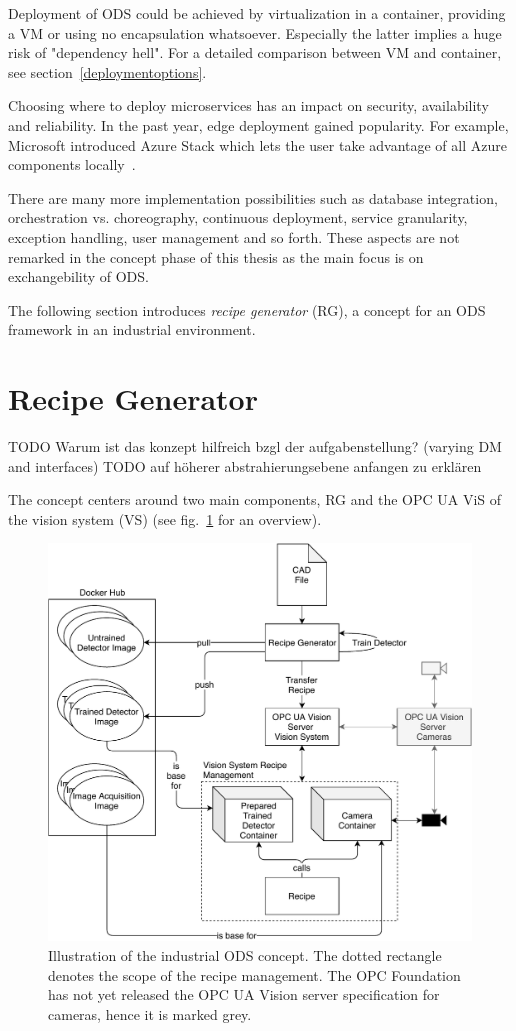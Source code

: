 Deployment of ODS could be achieved by virtualization in a container, providing a VM or using no encapsulation whatsoever. Especially the latter implies a huge risk of "dependency hell". For a detailed comparison between VM and container, see section~\ref{deploymentoptions}.

Choosing where to deploy microservices has an impact on security, availability and reliability. In the past year, edge deployment gained popularity. For example, Microsoft introduced Azure Stack which lets the user take advantage of all Azure components locally~\cite{Azure-Documentation2019Was2019}.

There are many more implementation possibilities such as database integration, orchestration vs. choreography, continuous deployment, service granularity, exception handling, user management and so forth. These aspects are not remarked in the concept phase of this thesis as the main focus is on exchangebility of ODS.

The following section introduces \textit{recipe generator} (RG), a concept for an ODS framework in an industrial environment.

\section{Recipe Generator}
TODO Warum ist das konzept hilfreich bzgl der aufgabenstellung? (varying DM and interfaces)
TODO auf höherer abstrahierungsebene anfangen zu erklären

The concept centers around two main components, RG and the OPC UA ViS of the vision system (VS) (see fig.~\ref{fig:concept} for an overview).
\begin{figure}
    \centering
    \includegraphics[width=\textwidth]{img/Concept.pdf}
    \caption[Concept]{Illustration of the industrial ODS concept. The dotted rectangle denotes the scope of the recipe management. The OPC Foundation has not yet released the OPC UA Vision server specification for cameras, hence it is marked grey.}
    \label{fig:concept}
\end{figure}

